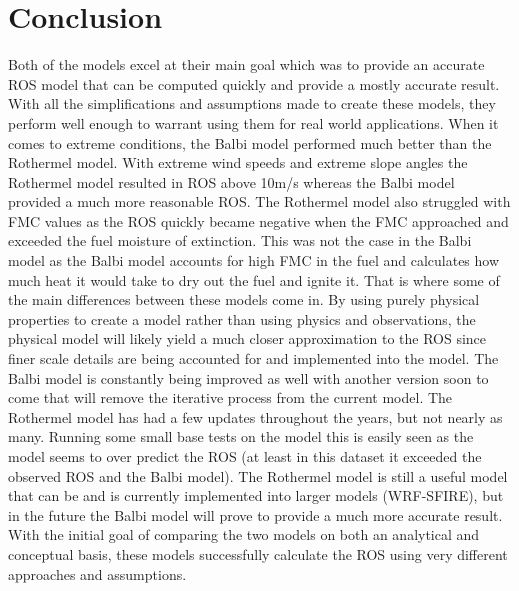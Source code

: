 \documentclass{article}
\begin{document}
\section{Conclusion}
\indent Both of the models excel at their main goal which was to provide an accurate ROS model that can be computed quickly and provide a mostly accurate result. With all the simplifications and assumptions made to create these models, they perform well enough to warrant using them for real world applications. When it comes to extreme conditions, the Balbi model performed much better than the Rothermel model. With extreme wind speeds and extreme slope angles the Rothermel model resulted in ROS above 10m/s whereas the Balbi model provided a much more reasonable ROS. The Rothermel model also struggled with FMC values as the ROS quickly became negative when the FMC approached and exceeded the fuel moisture of extinction. This was not the case in the Balbi model as the Balbi model accounts for high FMC in the fuel and calculates how much heat it would take to dry out the fuel and ignite it. That is where some of the main differences between these models come in. By using purely physical properties to create a model rather than using physics and observations, the physical model will likely yield a much closer approximation to the ROS since finer scale details are being accounted for and implemented into the model. The Balbi model is constantly being improved as well with another version soon to come that will remove the iterative process from the current model. The Rothermel model has had a few updates throughout the years, but not nearly as many. Running some small base tests on the model this is easily seen as the model seems to over predict the ROS (at least in this dataset it exceeded the observed ROS and the Balbi model). The Rothermel model is still a useful model that can be and is currently implemented into larger models (WRF-SFIRE), but in the future the Balbi model will prove to provide a much more accurate result. With the initial goal of comparing the two models on both an analytical and conceptual basis, these models successfully calculate the ROS using very different approaches and assumptions. 



%
%
%
\end{document}
